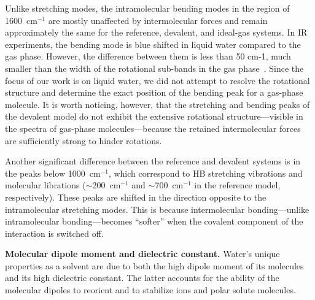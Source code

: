 \documentclass[journal=jacsat,manuscript=article]{achemso}
\begin{document}

Unlike stretching modes, the intramolecular bending modes in the region of 1600~cm$^{-1}$ are mostly unaffected by intermolecular forces and remain approximately the same for the reference, devalent, and ideal-gas systems. 
In IR experiments, the bending mode is blue shifted in liquid water compared to the gas phase. However, the difference between them is less than 50 cm-1, much smaller than the width of the rotational sub-bands in the gas phase~\cite{marechal2006hydrogen}. Since the focus of our work is on liquid water, we did not attempt to resolve the rotational structure and determine the exact position of the bending peak for a gas-phase molecule.
It is worth noticing, however, that the stretching and bending peaks of the devalent model do not exhibit the extensive rotational structure---visible in the spectra of gas-phase molecules---because the retained intermolecular forces are sufficiently strong to hinder rotations.

Another significant difference between the reference and devalent systems is in the peaks below 1000~cm$^{-1}$, which correspond to HB stretching vibrations and molecular librations ($\sim$200~cm$^{-1}$ and $\sim$700~cm$^{-1}$ in the reference model, respectively). These peaks are shifted in the direction opposite to the intramolecular stretching modes. This is because intermolecular bonding---unlike intramolecular bonding---becomes ``softer'' when the covalent component of the interaction is switched off.%

\textbf{Molecular dipole moment and dielectric constant.} Water's unique properties as a solvent are due to both the high dipole moment of its molecules and its high dielectric constant. 
The latter accounts for the ability of the molecular dipoles to reorient and to stabilize ions and polar solute molecules. 
\end{document}
